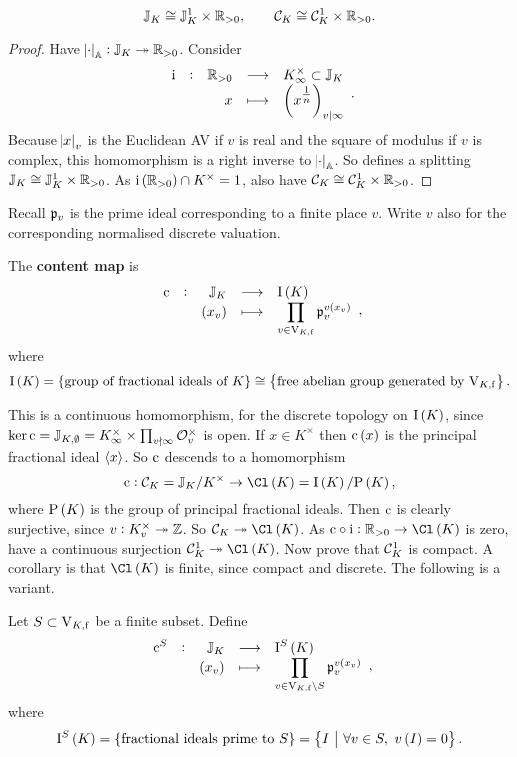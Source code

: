 \begin{proposition}
$$ \mathbb{J}_K \cong \mathbb{J}_K^1 \times \mathbb{R}_{> 0}, \qquad \mathcal{C}_K \cong \mathcal{C}_K^1 \times \mathbb{R}_{> 0}. $$
\end{proposition}

\begin{proof}
Have $ \abs{\cdot}_{\mathbb{A}} : \mathbb{J}_K \twoheadrightarrow \mathbb{R}_{> 0} $. Consider
$$ \function[\i]{\RR_{> 0}}{K_\infty^\times \subset \JJ_K}{x}{\br{x^{\tfrac{1}{n}}}_{v \mid \infty}}. $$
Because $ \abs{x}_v $ is the Euclidean AV if $ v $ is real and the square of modulus if $ v $ is complex, this homomorphism is a right inverse to $ \abs{\cdot}_{\mathbb{A}} $. So defines a splitting $ \mathbb{J}_K \cong \mathbb{J}_K^1 \times \mathbb{R}_{> 0} $. As $ \i\br{\RR_{> 0}} \cap K^\times = 1 $, also have $ \mathcal{C}_K \cong \mathcal{C}_K^1 \times \mathbb{R}_{> 0} $.
\end{proof}

Recall $ \mathfrak{p}_v $ is the prime ideal corresponding to a finite place $ v $. Write $ v $ also for the corresponding normalised discrete valuation.

\begin{definition*}
The \textbf{content map} is
$$ \function[\c]{\JJ_K}{\I\br{K}}{\br{x_v}}{\prod_{v \in \V_{K, \f}} \ppp_v^{v\br{x_v}}}, $$
where
$$ \I\br{K} = \cbr{\text{group of fractional ideals of} \ K} \cong \cbr{\text{free abelian group generated by} \ \V_{K, \f}}. $$
\end{definition*}

This is a continuous homomorphism, for the discrete topology on $ \I\br{K} $, since $ \ker \mathrm{c} = \mathbb{J}_{K, \emptyset} = K_\infty^\times \times \prod_{v \nmid \infty} \mathcal{O}_v^\times $ is open. If $ x \in K^\times $ then $ \c\br{x} $ is the principal fractional ideal $ \left\langle x \right\rangle $. So $ \mathrm{c} $ descends to a homomorphism
$$ \c : \CCC_K = \JJ_K / K^\times \to \Cl\br{K} = \I\br{K} / \P\br{K}, $$
where $ \P\br{K} $ is the group of principal fractional ideals. Then $ \mathrm{c} $ is clearly surjective, since $ v : K_v^\times \twoheadrightarrow \mathbb{Z} $. So $ \CCC_K \twoheadrightarrow \Cl\br{K} $. As $ \c \circ \i : \RR_{> 0} \to \Cl\br{K} $ is zero, have a continuous surjection $ \CCC_K^1 \twoheadrightarrow \Cl\br{K} $. Now prove that $ \mathcal{C}_K^1 $ is compact. A corollary is that $ \Cl\br{K} $ is finite, since compact and discrete. The following is a variant.

\begin{definition*}
Let $ S \subset \mathrm{V}_{K, \mathrm{f}} $ be a finite subset. Define
$$ \function[\c^S]{\JJ_K}{\I^S\br{K}}{\br{x_v}}{\prod_{v \in \V_{K, \f} \setminus S} \ppp_v^{v\br{x_v}}}, $$
where
$$ \I^S\br{K} = \cbr{\text{fractional ideals prime to} \ S} = \cbr{I \st \forall v \in S, \ v\br{I} = 0}. $$
\end{definition*}

